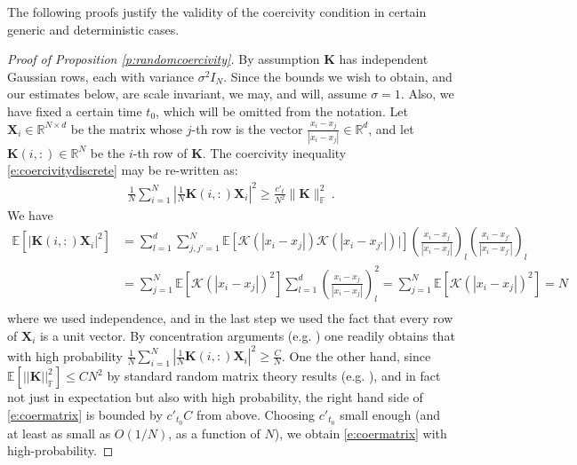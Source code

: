 \documentclass[A4paper,11pt]{article}
\theoremstyle{definition}
\begin{document}
{The following proofs justify the validity of the coercivity condition in certain generic and deterministic cases. }
\begin{proof}[Proof of Proposition \ref{p:randomcoercivity}]
By assumption $\mathbf K$ has independent Gaussian rows, each with variance $\sigma^2I_N$. %
Since the bounds we wish to obtain, and our estimates below, are scale invariant, we may, and will, assume $\sigma=1$. Also, we have fixed a certain time $t_0$, which will be omitted from the notation.
Let $\mathbf{X}_i\in\mathbb{R}^{N\times d}$ be the matrix whose $j$-th row is the vector $\frac{x_i-x_j}{|x_i-x_j|}\in\mathbb{R}^d$, and let $\mathbf{K}(i,:)\in\mathbb{R}^N$ be the $i$-th row of $\mathbf{K}$. The coercivity inequality \eqref{e:coercivitydiscrete} may be re-written as:
\begin{align}
\frac 1N\sum_{i=1}^N\left|\frac1N\mathbf{K}(i,:)\mathbf{X}_i\right|^2\ge\frac{c'_t}{N^2}\|\mathbf{K}\|^2_{\mathbb{F}}\,.
\label{e:coermatrix}
\end{align}
We have
\begin{align*}
\mathbb{E}\left[|\mathbf{K}(i,:)\mathbf{X}_i|^2\right]
&=\sum_{l=1}^d\sum_{j,j'=1}^N\mathbb{E}\left[\mathcal{K}(|x_i-x_j|)\mathcal{K}(|x_i-x_{j'}|)|\right] \left(\frac{x_i-x_j}{|x_i-x_j|}\right)_l \left(\frac{x_i-x_{j'}}{|x_i-x_{j'}|}\right)_l\\
&=\sum_{j=1}^N \mathbb{E}\left[\mathcal{K}(|x_i-x_j|)^2\right] \sum_{l=1}^d\left(\frac{x_i-x_j}{|x_i-x_j|}\right)^2_l = \sum_{j=1}^N \mathbb{E}\left[\mathcal{K}(|x_i-x_j|)^2\right]=N\\
\end{align*}
where we used independence, %
and in the last step we used the fact that every row of $\mathbf{X}_i$ is a unit vector. By concentration arguments (e.g. \cite{Vershynin:NARMT}) one readily obtains that with high probability
$
\frac 1N\sum_{i=1}^N\left|\frac1N\mathbf{K}(i,:)\mathbf{X}_i\right|^2\ge\frac CN
$.
One the other hand, since $\mathbb{E}[||\mathbf{K}||^2_{\mathbb{F}}]\le CN^2$ by standard random matrix theory results (e.g. \cite{Vershynin:NARMT}), and in fact not just in expectation but also with high probability, the right hand side of \eqref{e:coermatrix} is bounded by $c'_{t_0}C$ from above. Choosing $c'_{t_0}$ small enough (and at least as small as $O(1/N)$, as a function of $N$), we obtain \eqref{e:coermatrix} with high-probability.


\end{proof}
\end{document}
